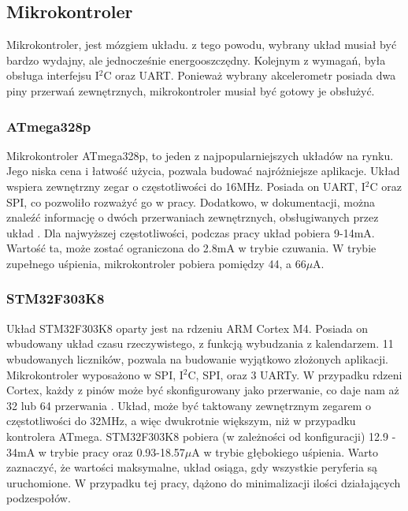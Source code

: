 \subsection{Mikrokontroler}
Mikrokontroler, jest mózgiem układu. z tego powodu, wybrany układ musiał być bardzo wydajny, ale jednocześnie energooszczędny. Kolejnym z wymagań, była obsługa interfejsu I$^{2}$C oraz UART. Ponieważ wybrany akcelerometr posiada dwa piny przerwań zewnętrznych, mikrokontroler musiał być gotowy je obsłużyć.

\subsubsection{ATmega328p}
Mikrokontroler ATmega328p, to jeden z najpopularniejszych układów na rynku. Jego niska cena i łatwość użycia, pozwala budować najróżniejsze aplikacje. Układ wspiera zewnętrzny zegar o częstotliwości do 16MHz. Posiada on UART, I$^{2}$C oraz SPI, co pozwoliło rozważyć go w pracy. Dodatkowo, w dokumentacji, można znaleźć informację o dwóch przerwaniach zewnętrznych, obsługiwanych przez układ \cite{ATMEGA328P}. Dla najwyższej częstotliwości, podczas pracy układ pobiera 9-14mA. Wartość ta, może zostać ograniczona do 2.8mA w trybie czuwania. W trybie zupełnego uśpienia, mikrokontroler pobiera pomiędzy 44, a 66$\mu$A.

\subsubsection{STM32F303K8}
Układ STM32F303K8 oparty jest na rdzeniu ARM Cortex M4. Posiada on wbudowany układ czasu rzeczywistego, z funkcją wybudzania z kalendarzem. 11 wbudowanych liczników, pozwala na budowanie wyjątkowo złożonych aplikacji. Mikrokontroler wyposażono w SPI, I$^{2}$C, SPI, oraz 3 UARTy. W przypadku rdzeni Cortex, każdy z pinów może być skonfigurowany jako przerwanie, co daje nam aż 32 lub 64 przerwania \cite{STM32F303K8}. Układ, może być taktowany zewnętrznym zegarem o częstotliwości do 32MHz, a więc dwukrotnie większym, niż w przypadku kontrolera ATmega. STM32F303K8 pobiera (w zależności od konfiguracji) 12.9 - 34mA w trybie pracy oraz 0.93-18.57$\mu$A w trybie głębokiego uśpienia. Warto zaznaczyć, że wartości maksymalne, układ osiąga, gdy wszystkie peryferia są uruchomione. W przypadku tej pracy, dążono do minimalizacji ilości działających podzespołów.

